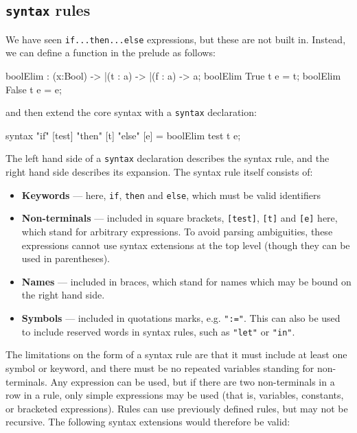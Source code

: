 \subsection{\texttt{syntax} rules}

We have seen \texttt{if...then...else} expressions, but these are not built in.
Instead, we can define a function in the prelude as follows:

\begin{code}
boolElim : (x:Bool) -> |(t : a) -> |(f : a) -> a; 
boolElim True  t e = t;
boolElim False t e = e;
\end{code}

\noindent
and then extend the core syntax with a \texttt{syntax} declaration:

\begin{code}
syntax "if" [test] "then" [t] "else" [e] = boolElim test t e;
\end{code}

\noindent
The left hand side of a \texttt{syntax} declaration describes the syntax rule, and the right hand side describes its expansion.
The syntax rule itself consists of:

\begin{itemize}
\item \textbf{Keywords} --- here, \texttt{if}, \texttt{then} and \texttt{else}, which must be valid identifiers
\item \textbf{Non-terminals} --- included in square brackets, \texttt{[test]}, \texttt{[t]} and \texttt{[e]} here, which stand for arbitrary expressions.
To avoid parsing ambiguities, these expressions cannot use syntax extensions at the top level (though they can be used in parentheses).
\item \textbf{Names} --- included in braces, which stand for names which may be bound on the right hand side.
\item \textbf{Symbols} --- included in quotations marks, e.g. \texttt{":="}.
This can also be used to include reserved words in syntax rules, such as \texttt{"let"} or \texttt{"in"}.
\end{itemize}

\noindent
The limitations on the form of a syntax rule are that it must include at least one symbol or keyword, and there must be no repeated variables standing for non-terminals.
Any expression can be used, but if there are two non-terminals in a row in a rule, only simple expressions may be used (that is, variables, constants, or bracketed expressions).
Rules can use previously defined rules, but may not be recursive.
The following syntax extensions would therefore be valid:

